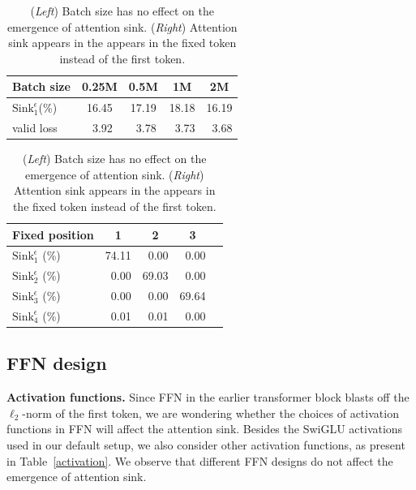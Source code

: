 \documentclass{article} \usepackage{iclr2025_conference,times}
\begin{document}
\begin{table}[htbp]
\caption{(\emph{Left}) Batch size has no effect on the emergence of attention sink. (\emph{Right}) Attention sink appears in the appears in the fixed token instead of the first token.}
\begin{minipage}[t]{0.52\linewidth}
\begin{center}
\begin{tabular}[t]{l|cccc}
\toprule
Batch size & 0.25M & 0.5M & 1M & 2M \\
\midrule
$\textrm{Sink}_1^{\epsilon}$(\%) & 16.45 & 17.19 & 18.18 & 16.19 \\
valid loss & \,\,\,3.92 & \,\,\,3.78 & \,\,\,3.73 & \,\,\,3.68 \\
\bottomrule
\end{tabular}
\end{center}
\end{minipage}
\hfill
\begin{minipage}[t]{0.47\linewidth}
\begin{center}
\begin{tabular}[t]{l|cccc}
\toprule  Fixed position & 1 & 2 & 3 \\
\midrule
$\textrm{Sink}_1^\epsilon$ (\%) & 74.11 & \,\,\,0.00 & \,\,\,0.00 \\
$\textrm{Sink}_2^\epsilon$ (\%) & \,\,\,0.00 & 69.03 & \,\,\,0.00 \\
$\textrm{Sink}_3^\epsilon$ (\%) & \,\,\,0.00 & \,\,\,0.00 & 69.64 \\
$\textrm{Sink}_4^\epsilon$ (\%) & \,\,\,0.01 & \,\,\,0.01 & \,\,\,0.00 \\
\bottomrule
\end{tabular}
\end{center}
\end{minipage}
\label{batch_fix}
\end{table}




\subsection{FFN design} 

\textbf{Activation functions.} Since FFN in the earlier transformer block blasts off the $\ell_2$-norm of the first token, we are wondering whether the choices of activation functions in FFN will affect the attention sink. Besides the SwiGLU activations used in our default setup, we also consider other activation functions, as present in Table~\ref{activation}. We observe that different FFN designs do not affect the emergence of attention sink.
\end{document}
